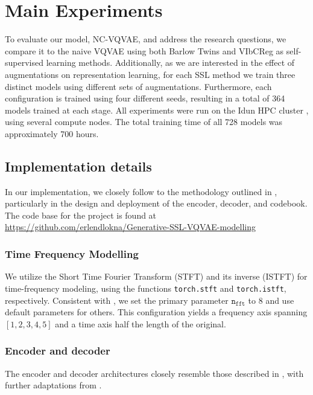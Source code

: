 \documentclass[../../thesis.tex]{subfiles}
\begin{document}
\section{Main Experiments}

To evaluate our model, NC-VQVAE, and address the research questions, we compare it to the naive VQVAE using both Barlow Twins and VIbCReg as self-supervised learning methods. Additionally, as we are interested in the effect of augmentations on representation learning, for each SSL method we train three distinct models using different sets of augmentations. Furthermore, each configuration is trained using four different seeds, resulting in a total of 364 models trained at each stage. All experiments were run on the Idun HPC cluster \cite{Idun}, using several compute nodes. The total training time of all 728 models was approximately 700 hours. 

\subsection{Implementation details}

In our implementation, we closely follow to the methodology outlined in \cite{TimeVQVAE}, particularly in the design and deployment of the encoder, decoder, and codebook. The code base for the project is found at \url{https://github.com/erlendlokna/Generative-SSL-VQVAE-modelling}

\subsubsection{Time Frequency Modelling}
We utilize the Short Time Fourier Transform (STFT) and its inverse (ISTFT) for time-frequency modeling, using the functions \texttt{torch.stft} and \texttt{torch.istft}, respectively. Consistent with \cite{TimeVQVAE}, we set the primary parameter $\texttt{n}_{\texttt{fft}}$ to 8 and use default parameters for others. This configuration yields a frequency axis spanning $[1, 2, 3, 4, 5]$ and a time axis half the length of the original.

\subsubsection{Encoder and decoder}

The encoder and decoder architectures closely resemble those described in \cite{nadavbh12}, with further adaptations from \cite{TimeVQVAE}.\newline
\end{document}
